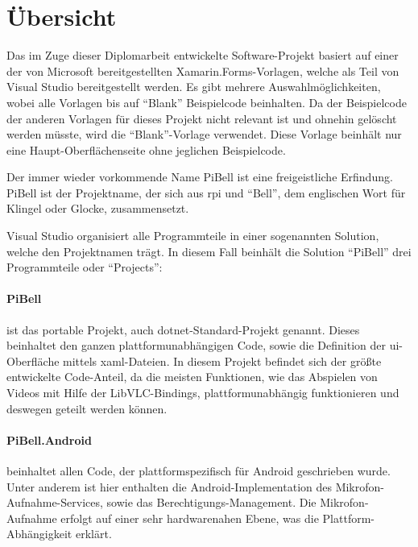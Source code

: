 
\label{ch:prog-doc}
\section{Übersicht}
Das im Zuge dieser Diplomarbeit entwickelte Software-Projekt basiert auf einer der von Microsoft bereitgestellten Xamarin.Forms-Vorlagen, welche als Teil von Visual Studio bereitgestellt werden.
Es gibt mehrere Auswahlmöglichkeiten, wobei alle Vorlagen bis auf \enquote{Blank} Beispielcode beinhalten.
Da der Beispielcode der anderen Vorlagen für dieses Projekt nicht relevant ist und ohnehin gelöscht werden müsste, wird die \enquote{Blank}-Vorlage verwendet.
Diese Vorlage beinhält nur eine Haupt-Oberflächenseite ohne jeglichen Beispielcode.

Der immer wieder vorkommende Name PiBell ist eine freigeistliche Erfindung. PiBell ist der Projektname, der sich aus \acl{rpi} und \enquote{Bell}, dem englischen Wort für Klingel oder Glocke, zusammensetzt.

Visual Studio organisiert alle Programmteile in einer sogenannten Solution, welche den Projektnamen trägt. In diesem Fall beinhält die Solution \enquote{PiBell} drei Programmteile oder \enquote{Projects}:
\paragraph{PiBell} ist das portable Projekt, auch \acs{dotnet}-Standard-Projekt genannt.
Dieses beinhaltet den ganzen plattformunabhängigen Code, sowie die Definition der \acs{ui}-Oberfläche mittels \acs{xaml}-Dateien.
In diesem Projekt befindet sich der größte entwickelte Code-Anteil, da die meisten Funktionen, wie das Abspielen von Videos mit Hilfe der LibVLC-Bindings, plattformunabhängig funktionieren und deswegen geteilt werden können.

\paragraph{PiBell.Android} beinhaltet allen Code, der plattformspezifisch für Android geschrieben wurde.
Unter anderem ist hier enthalten die Android-Implementation des Mikrofon-Auf\-nahme-Services, sowie das Berechtigungs-Management.
Die Mikrofon-Aufnahme erfolgt auf einer sehr hardwarenahen Ebene, was die Plattform-Abhängigkeit erklärt.

